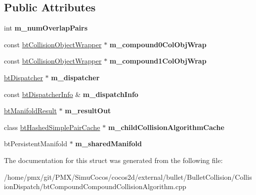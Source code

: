 \subsection*{Public Attributes}
\begin{DoxyCompactItemize}
\item 
\mbox{\label{structbtCompoundCompoundLeafCallback_a7920f4a20019f8e6511df436962c0f8b}} 
int {\bfseries m\+\_\+num\+Overlap\+Pairs}
\item 
\mbox{\label{structbtCompoundCompoundLeafCallback_a4efbe0325172f7013bd641c1ef7fbefe}} 
const \hyperlink{structbtCollisionObjectWrapper}{bt\+Collision\+Object\+Wrapper} $\ast$ {\bfseries m\+\_\+compound0\+Col\+Obj\+Wrap}
\item 
\mbox{\label{structbtCompoundCompoundLeafCallback_a7edeb1b1d78eb7f9599a90ff4ee0bcd9}} 
const \hyperlink{structbtCollisionObjectWrapper}{bt\+Collision\+Object\+Wrapper} $\ast$ {\bfseries m\+\_\+compound1\+Col\+Obj\+Wrap}
\item 
\mbox{\label{structbtCompoundCompoundLeafCallback_a4d91e085c30607f26cb08eccc9d60f24}} 
\hyperlink{classbtDispatcher}{bt\+Dispatcher} $\ast$ {\bfseries m\+\_\+dispatcher}
\item 
\mbox{\label{structbtCompoundCompoundLeafCallback_a8d00af6087d90a98a9a34e116fc76152}} 
const \hyperlink{structbtDispatcherInfo}{bt\+Dispatcher\+Info} \& {\bfseries m\+\_\+dispatch\+Info}
\item 
\mbox{\label{structbtCompoundCompoundLeafCallback_ae277b6f761a9c7fa509129db03ae88ea}} 
\hyperlink{classbtManifoldResult}{bt\+Manifold\+Result} $\ast$ {\bfseries m\+\_\+result\+Out}
\item 
\mbox{\label{structbtCompoundCompoundLeafCallback_a897184d28d2a4f71217459311bc0586a}} 
class \hyperlink{classbtHashedSimplePairCache}{bt\+Hashed\+Simple\+Pair\+Cache} $\ast$ {\bfseries m\+\_\+child\+Collision\+Algorithm\+Cache}
\item 
\mbox{\label{structbtCompoundCompoundLeafCallback_a06b4cccb2b7fa05a09f6674992c9dd1e}} 
bt\+Persistent\+Manifold $\ast$ {\bfseries m\+\_\+shared\+Manifold}
\end{DoxyCompactItemize}


The documentation for this struct was generated from the following file\+:\begin{DoxyCompactItemize}
\item 
/home/pmx/git/\+P\+M\+X/\+Simu\+Cocos/cocos2d/external/bullet/\+Bullet\+Collision/\+Collision\+Dispatch/bt\+Compound\+Compound\+Collision\+Algorithm.\+cpp\end{DoxyCompactItemize}
